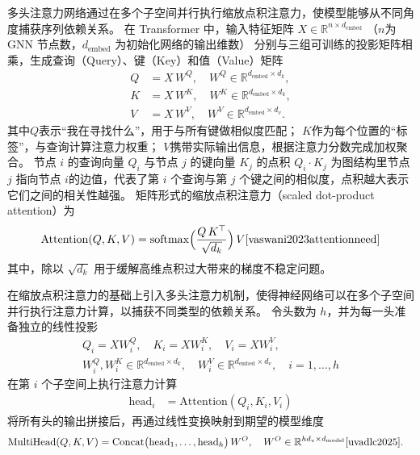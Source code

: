 多头注意力网络通过在多个子空间并行执行缩放点积注意力，使模型能够从不同角度捕获序列依赖关系。
在 Transformer 中，输入特征矩阵 ${X}\in\mathbb{R}^{n\times d_{\mathrm{embed}}}$
（$n$为 GNN 节点数，$d_{\mathrm{embed}}$ 为初始化网络的输出维数）
分别与三组可训练的投影矩阵相乘，生成查询（Query）、键（Key）和值（Value）矩阵
\begin{align}
    {Q} & = {X}\,W^Q, \quad W^Q \in\mathbb{R}^{d_{\mathrm{embed}}\times d_k}, \\
    {K} & = {X}\,W^K, \quad W^K \in\mathbb{R}^{d_{\mathrm{embed}}\times d_k}, \\
    {V} & = {X}\,W^V, \quad W^V \in\mathbb{R}^{d_{\mathrm{embed}}\times d_v}.
\end{align}
其中${Q}$表示“我在寻找什么”，用于与所有键做相似度匹配；
${K}$作为每个位置的“标签”，与查询计算注意力权重；
${V}$携带实际输出信息，根据注意力分数完成加权聚合。
节点 $i$ 的查询向量 ${Q}_i$ 与节点 $j$ 的键向量 ${K}_j$ 的点积 ${Q}_i \cdot {K}_j$
为图结构里节点 $j$ 指向节点 $i$的边值，代表了第 $i$ 个查询与第 $j$ 个键之间的相似度，点积越大表示它们之间的相关性越强。
矩阵形式的缩放点积注意力（scaled dot-product attention）为
\begin{align}
    \mathrm{Attention}({Q},{K},{V})
    = \mathrm{softmax} \Bigl(\frac{{Q}\,{K}^\top}{\sqrt{d_k}}\Bigr)\,{V}
    \cite{vaswani2023attentionneed}
\end{align}
其中，除以 $\sqrt{d_k}$ 用于缓解高维点积过大带来的梯度不稳定问题。

在缩放点积注意力的基础上引入多头注意力机制，使得神经网络可以在多个子空间并行执行注意力计算，以捕获不同类型的依赖关系。
令头数为 $h$，并为每一头准备独立的线性投影
\begin{align}
    Q_i = X W_i^Q,\quad
    K_i = X W_i^K,\quad
    V_i = X W_i^V,\quad \\
    W_i^Q, W_i^K \in\mathbb{R}^{d_{\text{embed}}\times d_k}, \quad
    W_i^V \in \mathbb{R}^{d_{\text{embed}}\times d_v},
    \quad i=1,\dots,h
\end{align}
在第 $i$ 个子空间上执行注意力计算
\begin{align}
    \mathrm{head}_i & = \mathrm{Attention}(Q_i, K_i, V_i)
\end{align}
将所有头的输出拼接后，再通过线性变换映射到期望的模型维度
\begin{align}
    \mathrm{MultiHead}(Q,K,V)
     & = \mathrm{Concat}\bigl(\mathrm{head}_1,\dots,\mathrm{head}_h\bigr)\,W^O,
    \quad W^O\in\mathbb{R}^{hd_v\times d_{\text{model}}}
    \cite{uvadlc2025}.
\end{align}

